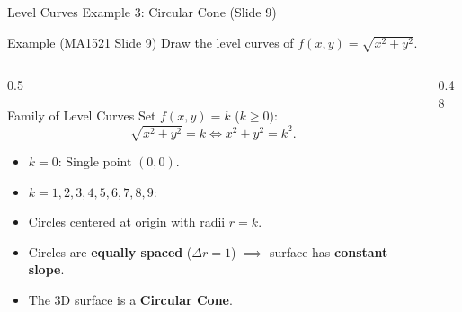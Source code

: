 \documentclass[aspectratio=169,10pt]{beamer}
\begin{document}
\begin{frame}{Level Curves Example 3: Circular Cone (Slide 9)}
  \begin{exampleblock}{Example (MA1521 Slide 9)}
    Draw the level curves of $f(x, y) = \sqrt{x^2 + y^2}$.
  \end{exampleblock}

  \begin{columns}[T]
    \begin{column}{0.5\textwidth}
      \begin{block}{Family of Level Curves}
        \small
        Set $f(x, y) = k$ ($k \ge 0$):
        \[
          \sqrt{x^2 + y^2} = k \iff x^2 + y^2 = k^2.
        \]
        \begin{itemize}
          \item $k = 0$: Single point $(0, 0)$.
          \item $k = 1, 2, 3, 4, 5, 6, 7, 8, 9$:
          \item Circles centered at origin with radii $r = k$.
          \item Circles are \textbf{equally spaced} ($\Delta r = 1$) $\implies$ surface has \textbf{constant slope}.
          \item The 3D surface is a \textbf{Circular Cone}.
        \end{itemize}
      \end{block}
    \end{column}

    \begin{column}{0.48\textwidth}
      \centering
    \end{column}
  \end{columns}
\end{frame}
\end{document}
